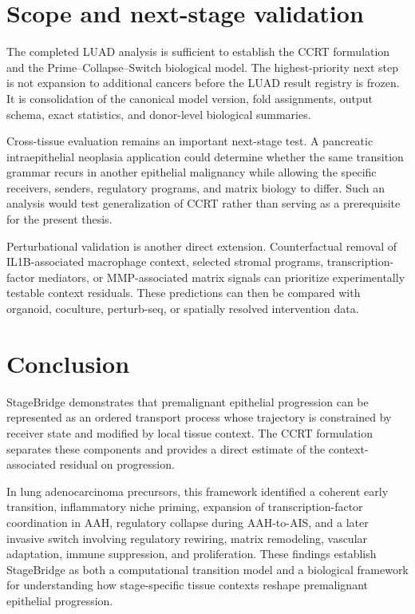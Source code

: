 \section{Scope and next-stage validation}

The completed LUAD analysis is sufficient to establish the CCRT formulation and the Prime--Collapse--Switch biological model. The highest-priority next step is not expansion to additional cancers before the LUAD result registry is frozen. It is consolidation of the canonical model version, fold assignments, output schema, exact statistics, and donor-level biological summaries.

Cross-tissue evaluation remains an important next-stage test. A pancreatic intraepithelial neoplasia application could determine whether the same transition grammar recurs in another epithelial malignancy while allowing the specific receivers, senders, regulatory programs, and matrix biology to differ. Such an analysis would test generalization of CCRT rather than serving as a prerequisite for the present thesis.

Perturbational validation is another direct extension. Counterfactual removal of IL1B-associated macrophage context, selected stromal programs, transcription-factor mediators, or MMP-associated matrix signals can prioritize experimentally testable context residuals. These predictions can then be compared with organoid, coculture, perturb-seq, or spatially resolved intervention data.

\section{Conclusion}

StageBridge demonstrates that premalignant epithelial progression can be represented as an ordered transport process whose trajectory is constrained by receiver state and modified by local tissue context. The CCRT formulation separates these components and provides a direct estimate of the context-associated residual on progression.

In lung adenocarcinoma precursors, this framework identified a coherent early transition, inflammatory niche priming, expansion of transcription-factor coordination in AAH, regulatory collapse during AAH-to-AIS, and a later invasive switch involving regulatory rewiring, matrix remodeling, vascular adaptation, immune suppression, and proliferation. These findings establish StageBridge as both a computational transition model and a biological framework for understanding how stage-specific tissue contexts reshape premalignant epithelial progression.


